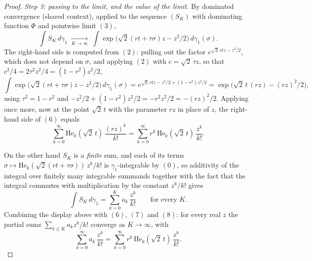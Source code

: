 \begin{proof}
\emph{Step 3: passing to the limit, and the value of the limit.}
By dominated convergence (shared context), applied to the sequence $(S_K)$ with
dominating function $\Phi$ and pointwise limit $(3)$,
\[
  \int S_K \, d\gamma_1
    \;\xrightarrow[K\to\infty]{}\;
  \int \exp\bigl(\sqrt2(rt+\tau\sigma)z - z^2/2\bigr)\, d\gamma_1(\sigma) .
\]
The right-hand side is computed from $(2)$: pulling out the factor
$e^{\sqrt2\,rtz - z^2/2}$, which does not depend on $\sigma$, and applying $(2)$
with $c = \sqrt2\,\tau z$, so that $c^2/4 = 2\tau^2z^2/4 = (1-r^2)z^2/2$,
\begin{equation*}
  \int \exp\bigl(\sqrt2(rt+\tau\sigma)z - z^2/2\bigr)\, d\gamma_1(\sigma)
    = e^{\sqrt2\,rtz - z^2/2 + (1-r^2)z^2/2}
    = \exp\bigl(\sqrt2\,t\,(rz) - (rz)^2/2\bigr),
  \tag{6}
\end{equation*}
using $\tau^2 = 1-r^2$ and $-z^2/2 + (1-r^2)z^2/2 = -r^2z^2/2 = -(rz)^2/2$.
Applying  once more, now at the point $\sqrt2\,t$ with
the parameter $rz$ in place of $z$, the right-hand side of $(6)$ equals
\begin{equation*}
  \sum_{k=0}^\infty \mathrm{He}_k(\sqrt2\,t)\,\frac{(rz)^k}{k!}
    = \sum_{k=0}^\infty r^k\,\mathrm{He}_k(\sqrt2\,t)\,\frac{z^k}{k!} .
  \tag{7}
\end{equation*}

On the other hand $S_K$ is a \emph{finite} sum, and each of its terms
$\sigma \mapsto \mathrm{He}_k(\sqrt2(rt+\tau\sigma))\,z^k/k!$ is
$\gamma_1$-integrable by $(0)$, so additivity of the integral over finitely many
integrable summands together with the fact that the integral commutes with
multiplication by the constant $z^k/k!$ gives
\begin{equation*}
  \int S_K\, d\gamma_1 = \sum_{k=0}^{K} a_k\,\frac{z^k}{k!}
  \qquad\text{for every } K .
  \tag{8}
\end{equation*}
Combining the display above with $(6)$, $(7)$ and $(8)$: for every real $z$ the
partial sums $\sum_{k\leq K} a_k z^k/k!$ converge as $K \to \infty$, with
\begin{equation*}
  \sum_{k=0}^\infty a_k\,\frac{z^k}{k!}
    = \sum_{k=0}^\infty r^k\,\mathrm{He}_k(\sqrt2\,t)\,\frac{z^k}{k!} .
  \tag{9}
\end{equation*}


\end{proof}

